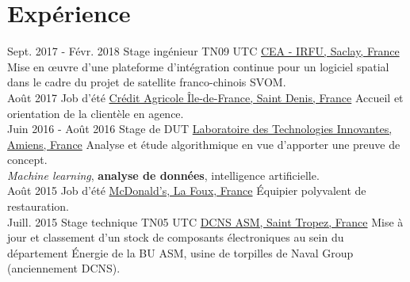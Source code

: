 \documentclass[letterpaper]{twentysecondcv} %
\begin{document}
\makeprofile %


\section{Expérience}

\begin{twenty} %
    \twentyitem
    	{Sept. 2017 -}
		{Févr. 2018}
        {Stage ingénieur TN09 UTC}
        {\href{http://irfu.cea.fr/}{CEA - IRFU, Saclay, France}}
        {}
        {Mise en œuvre d'une plateforme d'intégration continue pour un logiciel spatial dans le cadre du projet de satellite franco-chinois SVOM.}
    \\
    \twentyitem
    	{Août 2017}
		{}
        {Job d'été}
        {\href{https://ca-paris.com/}{Crédit Agricole Île-de-France, Saint Denis, France}}
        {}
        {Accueil et orientation de la clientèle en agence.}
    \\
	\twentyitem
    	{Juin 2016 -}
		{Août 2016}
        {Stage de DUT}
        {\href{http://lti-picardie.fr/}{Laboratoire des Technologies Innovantes, Amiens, France}}
        {}
        {Analyse et étude algorithmique en vue d'apporter une preuve de concept.\\\textit{Machine learning}, \textbf{analyse de données}, intelligence artificielle.}
    \\   
    \twentyitem
   		{Août 2015}
        {}
        {Job d'été}
        {\href{https://www.restaurants.mcdonalds.fr/mcdonalds-gassin}{McDonald's, La Foux, France}}
        {}
        {Équipier polyvalent de restauration.}
     \\
     \twentyitem
   		{Juill. 2015}
		{}
        {Stage technique TN05 UTC}
        {\href{https://www.naval-group.com/fr/}{DCNS ASM, Saint Tropez, France}}
        {}
        {Mise à jour et classement d'un stock de composants électroniques au sein du département Énergie de la BU ASM, usine de torpilles de Naval Group (anciennement DCNS).}
        
\end{twenty}

\end{document}
